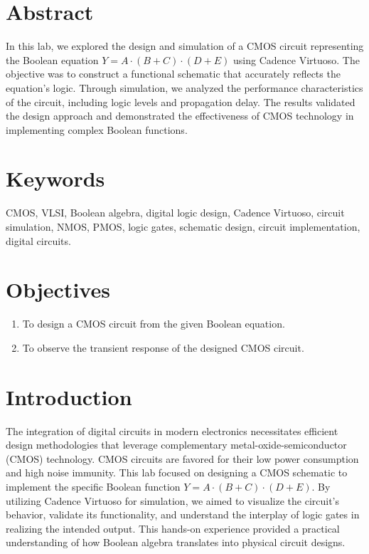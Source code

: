 \documentclass[11pt]{article}
\begin{document}
\tableofcontents
\listoffigures
\listoftables
\pagestyle{fancy}
\fancyhead{}
\fancyfoot{}
\newpage
\section{Abstract}
In this lab, we explored the design and simulation of a CMOS circuit representing the Boolean equation $Y=A\cdot(B+C)\cdot(D+E)$ using Cadence Virtuoso. The objective was to construct a functional schematic that accurately reflects the equation's logic. Through simulation, we analyzed the performance characteristics of the circuit, including logic levels and propagation delay. The results validated the design approach and demonstrated the effectiveness of CMOS technology in implementing complex Boolean functions.
\section{Keywords}
CMOS, VLSI, Boolean algebra, digital logic design, Cadence Virtuoso, circuit simulation, NMOS, PMOS, logic gates, schematic design, circuit implementation, digital circuits.
\section{Objectives}
\begin{enumerate}
    \item To design a CMOS circuit from the given Boolean equation.
    \item To observe the transient response of the designed CMOS circuit.
\end{enumerate}
\section{Introduction}
The integration of digital circuits in modern electronics necessitates efficient design methodologies that leverage complementary metal-oxide-semiconductor (CMOS) technology. CMOS circuits are favored for their low power consumption and high noise immunity. This lab focused on designing a CMOS schematic to implement the specific Boolean function $Y=A\cdot(B+C)\cdot(D+E)$. By utilizing Cadence Virtuoso for simulation, we aimed to visualize the circuit's behavior, validate its functionality, and understand the interplay of logic gates in realizing the intended output. This hands-on experience provided a practical understanding of how Boolean algebra translates into physical circuit designs.
\end{document}
